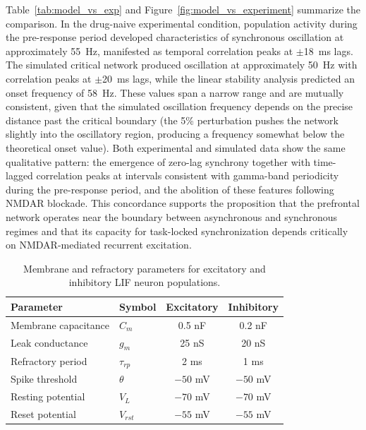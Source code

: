 \documentclass[10pt]{article}
\begin{document}
Table~\ref{tab:model_vs_exp} and Figure~\ref{fig:model_vs_experiment} summarize the comparison. In the drug-naive experimental condition, population activity during the pre-response period developed characteristics of synchronous oscillation at approximately 55~Hz, manifested as temporal correlation peaks at $\pm$18~ms lags. The simulated critical network produced oscillation at approximately 50~Hz with correlation peaks at $\pm$20~ms lags, while the linear stability analysis predicted an onset frequency of 58~Hz. These values span a narrow range and are mutually consistent, given that the simulated oscillation frequency depends on the precise distance past the critical boundary (the 5\% perturbation pushes the network slightly into the oscillatory region, producing a frequency somewhat below the theoretical onset value). Both experimental and simulated data show the same qualitative pattern: the emergence of zero-lag synchrony together with time-lagged correlation peaks at intervals consistent with gamma-band periodicity during the pre-response period, and the abolition of these features following NMDAR blockade. This concordance supports the proposition that the prefrontal network operates near the boundary between asynchronous and synchronous regimes and that its capacity for task-locked synchronization depends critically on NMDAR-mediated recurrent excitation.


\begin{table}[htbp]
\centering
\caption{Membrane and refractory parameters for excitatory and inhibitory LIF neuron populations.}
\label{tab:neuron_params}
\begin{tabular}{llcc}
\toprule
Parameter & Symbol & Excitatory & Inhibitory \\
\midrule
Membrane capacitance & $C_m$ & 0.5 nF & 0.2 nF \\
Leak conductance & $g_m$ & 25 nS & 20 nS \\
Refractory period & $\tau_{rp}$ & 2 ms & 1 ms \\
Spike threshold & $\theta$ & $-50$ mV & $-50$ mV \\
Resting potential & $V_L$ & $-70$ mV & $-70$ mV \\
Reset potential & $V_{rst}$ & $-55$ mV & $-55$ mV \\
\bottomrule
\end{tabular}
\end{table}
\end{document}

